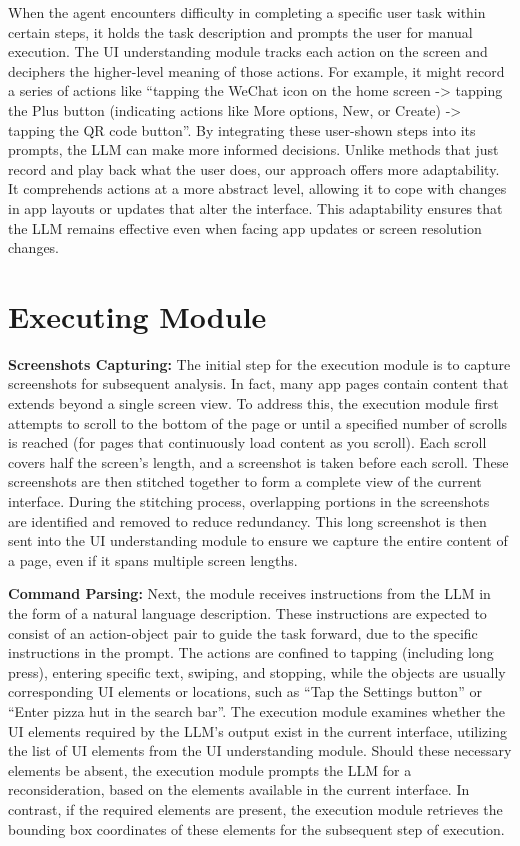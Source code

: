 When the agent encounters difficulty in completing a specific user task within certain steps, it holds the task description and prompts the user for manual execution. The UI understanding module tracks each action on the screen and deciphers the higher-level meaning of those actions. For example, it might record a series of actions like ``tapping the WeChat icon on the home screen -> tapping the Plus button (indicating actions like More options, New, or Create) -> tapping the QR code button''. By integrating these user-shown steps into its prompts, the LLM can make more informed decisions. Unlike methods that just record and play back what the user does, our approach offers more adaptability. It comprehends actions at a more abstract level, allowing it to cope with changes in app layouts or updates that alter the interface. This adaptability ensures that the LLM remains effective even when facing app updates or screen resolution changes.

\section{Executing Module}

\textbf{Screenshots Capturing:} The initial step for the execution module is to capture screenshots for subsequent analysis. In fact, many app pages contain content that extends beyond a single screen view. To address this, the execution module first attempts to scroll to the bottom of the page or until a specified number of scrolls is reached (for pages that continuously load content as you scroll). Each scroll covers half the screen's length, and a screenshot is taken before each scroll. These screenshots are then stitched together to form a complete view of the current interface. During the stitching process, overlapping portions in the screenshots are identified and removed to reduce redundancy. This long screenshot is then sent into the UI understanding module to ensure we capture the entire content of a page, even if it spans multiple screen lengths.

\textbf{Command Parsing:} 
Next, the module receives instructions from the LLM in the form of a natural language description. These instructions are expected to consist of an action-object pair to guide the task forward, due to the specific instructions in the prompt. The actions are confined to tapping (including long press), entering specific text, swiping, and stopping, while the objects are usually corresponding UI elements or locations, such as ``Tap the Settings button'' or ``Enter pizza hut in the search bar''. The execution module examines whether the UI elements required by the LLM's output exist in the current interface, utilizing the list of UI elements from the UI understanding module. Should these necessary elements be absent, the execution module prompts the LLM for a reconsideration, based on the elements available in the current interface. In contrast, if the required elements are present, the execution module retrieves the bounding box coordinates of these elements for the subsequent step of execution. 

